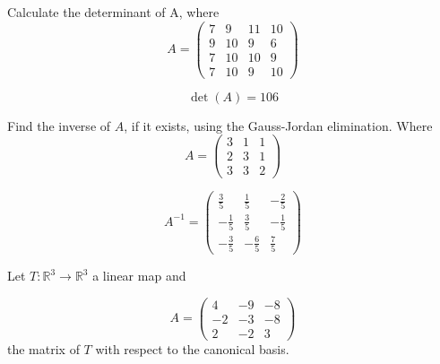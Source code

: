 \begin{questions}

\question Calculate the determinant of A, where
$$
A=\left(\begin{array}{rrrr}
7 & 9 & 11 & 10 \\
9 & 10 & 9 & 6 \\
7 & 10 & 10 & 9 \\
7 & 10 & 9 & 10
\end{array}\right)
$$

\begin{solution}
$$\det(A)=106$$
\end{solution}

\question Find the inverse of $A$, if it exists, using the Gauss-Jordan elimination. Where
$$
A=\left(\begin{array}{rrr}
3 & 1 & 1 \\
2 & 3 & 1 \\
3 & 3 & 2
\end{array}\right)
$$

\begin{solution}
$$A^{-1}=\left(\begin{array}{rrr}
\frac{3}{5} & \frac{1}{5} & -\frac{2}{5} \\
-\frac{1}{5} & \frac{3}{5} & -\frac{1}{5} \\
-\frac{3}{5} & -\frac{6}{5} & \frac{7}{5}
\end{array}\right)$$
\end{solution}

\question Let $T:\mathbb{R}^3\rightarrow\mathbb{R}^3$  a linear map and
 
$$
A=\left(\begin{array}{rrr}
4 & -9 & -8 \\
-2 & -3 & -8 \\
2 & -2 & 3
\end{array}\right)
$$
the matrix of $T$ with respect to the canonical basis.
\end{questions}

